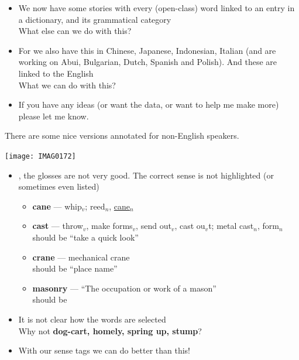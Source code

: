 \documentclass[a4paper,landscape,headrule,footrule,xetex]{foils}
\begin{document}




\begin{itemize}
\item We now have some stories with every (open-class) word linked to
  an entry in a dictionary, and its grammatical category \\ What else can
  we do with this?
\item For  we also have this in Chinese, Japanese, Indonesian,
  Italian (and are working on Abui, Bulgarian, Dutch, Spanish and
  Polish).  And these are linked to the English
  \\ What we can do with this?
\item If you have any ideas (or want the data, or want to help me make
  more) please let me know.

\end{itemize}




There are some nice versions annotated for non-English speakers.


\texttt{[image: IMAG0172]}




\begin{itemize}
\item {}, the glosses are not very good.  The correct sense is not
  highlighted (or sometimes even listed)
    \begin{itemize}
    \item \textbf{cane} --- whip$_v$; reed$_n$, \ul{cane$_n$}
    \item \textbf{cast} ---  throw$_v$, make forms$_v$, send out$_v$,
      cast ou$_v$t; metal cast$_n$, form$_n$
      \\ should be  ``take a quick look''
    \item \textbf{crane} --- mechanical crane
      \\ should be  ``place name''
    \item \textbf{masonry} --- ``The occupation or work of a mason''
      \\ should be 
  \end{itemize}
\item It is not clear how the words are selected
\\ Why not \textbf{dog-cart, homely, spring up, stump}?
\item With our sense tags we can do better than this!
\end{itemize}
\end{document}
